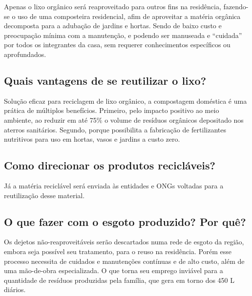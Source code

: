 	Apenas o lixo orgânico será reaproveitado para outros fins na residência, fazendo-se o uso de uma composteira residencial, afim de aproveitar a matéria orgânica decomposta para a adubação de jardins e hortas. Sendo de baixo custo e preocupação mínima com a manutenção, e podendo ser manuseada e “cuidada” por todos os integrantes da casa, sem requerer conhecimentos específicos ou aprofundados. 

\subsection{Quais vantagens de se reutilizar o lixo?}

	Solução eficaz para reciclagem de lixo orgânico, a compostagem doméstica é uma prática de múltiplos benefícios. Primeiro, pelo impacto positivo ao meio ambiente, ao reduzir em até 75\% o volume de resíduos orgânicos depositado nos aterros sanitários. Segundo, porque possibilita a fabricação de fertilizantes nutritivos para uso em hortas, vasos e jardins a custo zero.

\subsection{Como direcionar os produtos recicláveis?}

	Já a matéria reciclável será enviada às entidades e ONGs voltadas para a reutilização desse material.

\subsection{O que fazer com o esgoto produzido? Por quê?}

	Os dejetos não-reaproveitáveis serão descartados numa rede de esgoto da região, embora seja possível seu tratamento, para o reuso na residência. Porém esse processo necessita de cuidados e manutenções contínuas e de alto custo, além de uma mão-de-obra especializada. O que torna seu emprego inviável para a quantidade de resíduos produzidas pela família, que gera em torno dos 450 L diários.\cite{estimativaNBR7229}\cite{ecycle}
